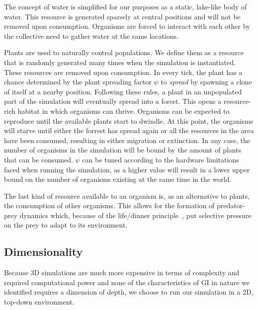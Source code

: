 The concept of water is simplified for our purposes as a static, lake-like body of water.
This resource is generated sparsely at central positions and will not be removed upon consumption.
Organisms are forced to interact with each other by the collective need to gather water at the same locations.

Plants are used to naturally control populations. We define them as a resource that is randomly generated
many times when the simulation is instantiated. These resources are removed upon consumption. In every tick, 
the plant has a chance determined by the plant spreading factor \(\psi \) to \emph{spread} by spawning a clone of itself
at a nearby position. Following these rules, a plant in an unpopulated part of the simulation will eventually spread 
into a forest.
This opens a resource-rich habitat in which organisms can thrive. Organisms can be expected to 
reproduce until the available plants start to dwindle. At this point, the organisms will starve until either 
the forrest has spread again or all the resources in the area have been consumed, resulting in either
migration or extinction. In any case, the number of organisms in the simulation will be bound by the amount of 
plants that can be consumed. 
\(\psi \) can be tuned according to the hardware limitations faced when running the simulation, as a higher value
will result in a lower upper bound on the number of organisms existing at the same time in the world.

The last kind of resource available to an organism is, as an alternative to plants, the consumption of 
other organisms. This allows for the formation of predator-prey dynamics which, 
because of the life/dinner principle~\cite{Dawkins1982}, put selective pressure on the prey to adapt to its 
environment.

\subsection{Dimensionality}
Because 3D simulations are much more expensive in terms of complexity and required computational power and
none of the characteristics of GI in nature we identified requires a dimension of depth, we choose
to run our simulation in a 2D, top-down environment.
